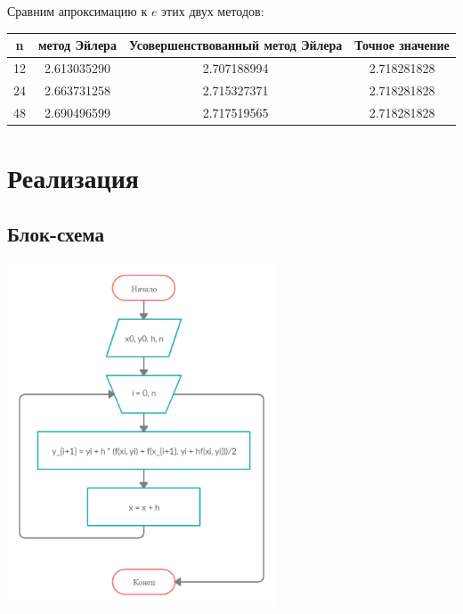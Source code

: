 \documentclass[11pt, english]{article}
\begin{document}
Сравним апроксимацию к $e$ этих двух методов:
\begin{center}
 \begin{tabular}{||c | c | c | c||} 
 \hline
 n & метод Эйлера & Усовершенствованный метод Эйлера & Точное значение \\ [0.5ex] 
 \hline\hline
 12 & 2.613035290 & 2.707188994 & 2.718281828 \\ 
 \hline
 24 & 2.663731258 & 2.715327371 & 2.718281828 \\
 \hline
 48 & 2.690496599 & 2.717519565 & 2.718281828 \\
 \hline
\end{tabular}
\end{center}
\newpage
\section{Реализация}
\subsection{Блок-схема}
\begin{center}
    \includegraphics[width=8cm]{schema.png}
\end{center}

\newpage
\end{document}
